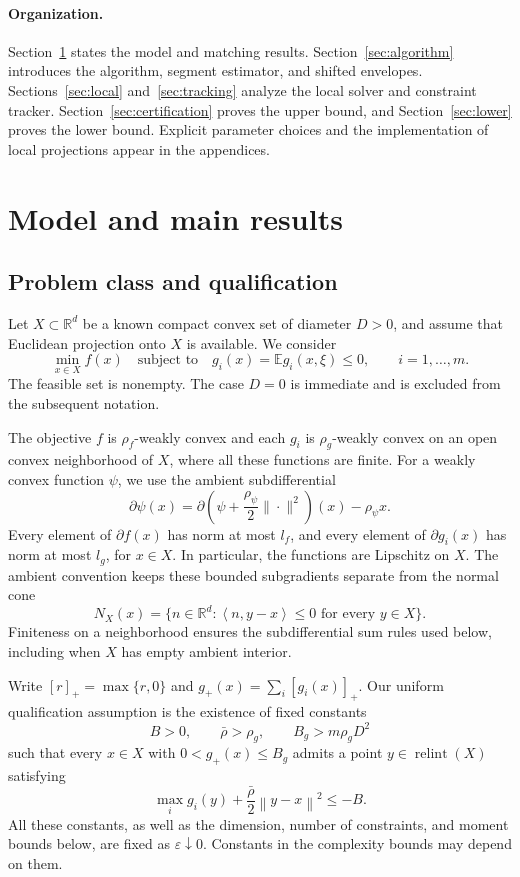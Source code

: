 \documentclass[11pt,a4paper]{article}
\newcommand{\R}{\mathbb R}
\newcommand{\E}{\mathbb E}
\newcommand{\eps}{\varepsilon}
\newcommand{\norm}[1]{\left\lVert#1\right\rVert}
\newcommand{\ip}[2]{\left\langle#1,#2\right\rangle}
\theoremstyle{remark}
\numberwithin{equation}{section}
\begin{document}
\paragraph{Organization.}
Section~\ref{sec:model} states the model and matching results. Section~\ref{sec:algorithm} introduces the algorithm, segment estimator, and shifted envelopes. Sections~\ref{sec:local} and~\ref{sec:tracking} analyze the local solver and constraint tracker. Section~\ref{sec:certification} proves the upper bound, and Section~\ref{sec:lower} proves the lower bound. Explicit parameter choices and the implementation of local projections appear in the appendices.

\section{Model and main results}\label{sec:model}
\subsection{Problem class and qualification}
Let $X\subset\R^d$ be a known compact convex set of diameter $D>0$, and assume that Euclidean projection onto $X$ is available. We consider
\begin{equation}
 \min_{x\in X} f(x)
 \quad\text{subject to}\quad
 g_i(x)=\E g_i(x,\xi)\le0,
 \qquad i=1,\ldots,m.
 \label{eq:problem}
\end{equation}
The feasible set is nonempty. The case $D=0$ is immediate and is excluded from the subsequent notation.

The objective $f$ is $\rho_f$-weakly convex and each $g_i$ is $\rho_g$-weakly convex on an open convex neighborhood of $X$, where all these functions are finite. For a weakly convex function $\psi$, we use the ambient subdifferential
\[
 \partial\psi(x)
 =\partial\!\left(\psi+\frac{\rho_\psi}{2}\|\cdot\|^2\right)(x)-\rho_\psi x.
\]
Every element of $\partial f(x)$ has norm at most $l_f$, and every element of $\partial g_i(x)$ has norm at most $l_g$, for $x\in X$. In particular, the functions are Lipschitz on $X$. The ambient convention keeps these bounded subgradients separate from the normal cone
\[
 N_X(x)=\{n\in\R^d:\ip n{y-x}\le0\text{ for every }y\in X\}.
\]
Finiteness on a neighborhood ensures the subdifferential sum rules used below, including when $X$ has empty ambient interior.

Write $[r]_+=\max\{r,0\}$ and $g_+(x)=\sum_i[g_i(x)]_+$. Our uniform qualification assumption is the existence of fixed constants
\[
 B>0,\qquad \bar\rho>\rho_g,\qquad B_g>m\rho_gD^2
\]
such that every $x\in X$ with $0<g_+(x)\le B_g$ admits a point $y\in\operatorname{relint}(X)$ satisfying
\begin{equation}
 \max_i g_i(y)+\frac{\bar\rho}{2}\norm{y-x}^2\le-B.
 \label{eq:cq}
\end{equation}
All these constants, as well as the dimension, number of constraints, and moment bounds below, are fixed as $\eps\downarrow0$. Constants in the complexity bounds may depend on them.
\end{document}
